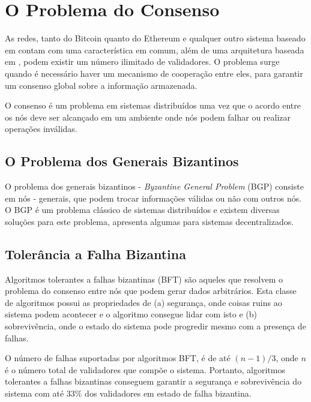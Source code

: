 \documentclass[tcc,capa]{texufpel}
\begin{document}
\section{O Problema do Consenso}\label{sc:problema-do-consenso}

    As redes, tanto do Bitcoin quanto do Ethereum e qualquer outro sistema baseado em \bchain contam com uma característica em comum, além de uma arquitetura baseada em \bchain, podem existir um número ilimitado de validadores. O problema surge quando é necessário haver um mecanismo de cooperação entre eles, para garantir um consenso global sobre a informação armazenada.
    
    O consenso é um problema em sistemas distribuídos uma vez que o acordo entre os nós deve ser alcançado em um ambiente onde nós podem falhar ou realizar operações inválidas.
        
    \subsection{O Problema dos Generais Bizantinos}\label{ssc:bgp}
    
    O problema dos generais bizantinos - \textit{Byzantine General Problem} (BGP) consiste em nós - generais, que podem trocar informações válidas ou não com outros nós. O BGP é um problema clássico de sistemas distribuídos e existem diversas soluções para este problema, \cite{coulouris} apresenta algumas para sistemas decentralizados.
    
    \subsection{Tolerância a Falha Bizantina}\label{ssc:bft}
    
    Algoritmos tolerantes a falhas bizantinas (BFT) são aqueles que resolvem o problema do consenso entre nós que podem gerar dados arbitrários. Esta classe de algoritmos possui as propriedades de (a) segurança, onde coisas ruins ao sistema podem acontecer e o algoritmo consegue lidar com isto e (b) sobrevivência, onde o estado do sistema pode progredir mesmo com a presença de falhas.
    
    O número de falhas suportadas por algoritmos BFT, é de até $(n - 1)/3$, onde $n$ é o número total de validadores que compõe o sistema. Portanto, algoritmos tolerantes a falhas bizantinas conseguem garantir a segurança e sobrevivência do sistema com até 33\% dos validadores em estado de falha bizantina.
    
\end{document}
